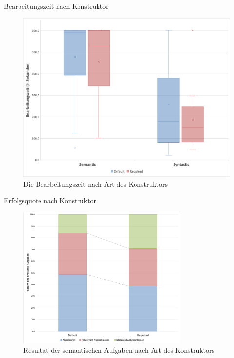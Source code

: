 \documentclass[10pt]{beamer}
\begin{document}
	\begin{frame}{Bearbeitungszeit nach Konstruktor}
		\begin{figure}
			\includegraphics[scale=0.32]{graphics/box_time-constructor.png}
			\caption{\label{fig:box_time-constructor.png} Die Bearbeitungszeit nach Art des Konstruktors}
		\end{figure}
	\end{frame}

	\begin{frame}{Erfolgsquote nach Konstruktor}
		\begin{figure}
			\includegraphics[width=0.76\textwidth]{graphics/bar_result_sem.png}
			\caption{\label{fig:bar_result_sem.png} Resultat der semantischen Aufgaben nach Art des Konstruktors}
		\end{figure}
	\end{frame}
	
\end{document}
